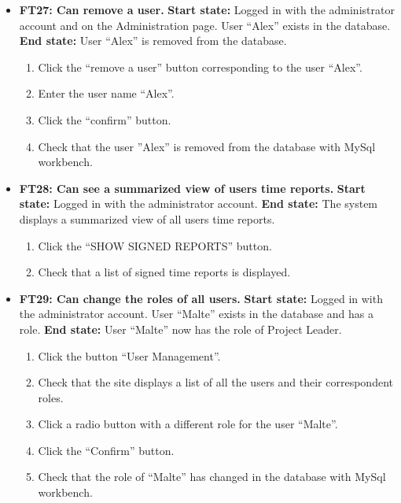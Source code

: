 \documentclass{article}
\begin{document}
\begin{itemize}
		
		\item \textbf{FT27: Can remove a user.} \newline
		\textbf{Start state:} Logged in with the administrator account and on the Administration page. User “Alex” exists in the database. \newline
		\textbf{End state:} User “Alex”  is removed from the database.
		\begin{enumerate}
			\item Click the “remove a user” button corresponding to the user “Alex”.
			\item Enter the user name “Alex”.
			\item Click the “confirm” button.
			\item Check that the user ”Alex” is removed from the database with MySql workbench.
		\end{enumerate}
		
		
		\item \textbf{FT28: Can see a summarized view of users time reports.} \newline
		\textbf{Start state:} Logged in with the administrator account.  \newline
		\textbf{End state:} The system displays a summarized view of all users time reports.
		\begin{enumerate}
			\item Click the “SHOW SIGNED REPORTS” button.
			\item Check that a list of signed time reports is displayed.
		\end{enumerate}
		
		
		\item \textbf{FT29: Can change the roles of all users.} \newline
		\textbf{Start state:} Logged in with the administrator account. User “Malte” exists in the database and has a role.  \newline
		\textbf{End state:} User “Malte” now has the role of Project Leader.
		\begin{enumerate}
			\item Click the button “User Management”.
			\item Check that the site displays a list of all the users and their correspondent roles.
			\item Click a radio button with a different role for the user “Malte”.
			\item Click the “Confirm” button. 
			\item Check that the role of “Malte” has changed in the database with MySql workbench.
		\end{enumerate}
		

\end{itemize}
\end{document}
